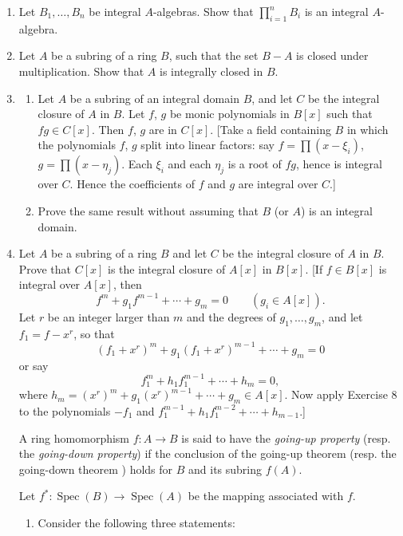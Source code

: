 \begin{enumerate}
\item Let $B_1,\ldots,B_n$ be integral $A$-algebras. Show that $\prod_{i=1}^nB_i$ is an integral $A$-algebra.

\item Let $A$ be a subring of a ring $B$, such that the set $B-A$ is closed under multiplication. Show that $A$ is integrally closed in $B$.

\item
\begin{enumerate}
\renewcommand{\labelenumii}{\roman{enumii})}
\item Let $A$ be a subring of an integral domain $B$, and let $C$ be the integral closure of $A$ in $B$. Let $f$, $g$ be monic polynomials in $B[x]$ such that $fg\in C[x]$. Then $f$, $g$ are in $C[x]$. [Take a field containing $B$ in which the polynomials $f$, $g$ split into linear factors: say $f=\prod(x-\xi_i)$, $g=\prod(x-\eta_j)$. Each $\xi_i$ and each $\eta_j$ is a root of $fg$, hence is integral over $C$. Hence the coefficients of $f$ and $g$ are integral over $C$.]
\item Prove the same result without assuming that $B$ (or $A$) is an integral domain.
\end{enumerate}

\item Let $A$ be a subring of a ring $B$ and let $C$ be the integral closure of $A$ in $B$. Prove that $C[x]$ is the integral closure of $A[x]$ in $B[x]$. [If $f\in B[x]$ is integral over $A[x]$, then
\[
 f^m+g_1f^{m-1}+\cdots+g_m=0\qquad(g_i\in A[x]).
\]
Let $r$ be an integer larger than $m$ and the degrees of $g_1,\ldots,g_m$, and let $f_1=f-x^r$, so that
\[
 (f_1+x^r)^m+g_1(f_1+x^r)^{m-1}+\cdots+g_m=0
\]
or say
\[
 f_1^m+h_1f_1^{m-1}+\cdots+h_m=0,
\]
where $h_m=(x^r)^m+g_1(x^r)^{m-1}+\cdots+g_m\in A[x]$. Now apply Exercise 8 to the polynomials $-f_1$ and $f_1^{m-1}+h_1f_1^{m-2}+\cdots+h_{m-1}$.]

\amstaritem A ring homomorphism $f:A\longrightarrow B$ is said to have the \textit{going-up property} (resp. the \textit{going-down property}) if the conclusion of the going-up theorem  (resp. the going-down theorem ) holds for $B$ and its subring $f(A)$.

Let $f^*:\operatorname{Spec}(B)\longrightarrow\operatorname{Spec}(A)$ be the mapping associated with $f$.
\begin{enumerate}
\renewcommand{\labelenumii}{\roman{enumii})}
\item Consider the following three statements:


\end{enumerate}
\end{enumerate}
